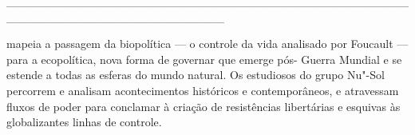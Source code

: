 \hspace*{-2cm}\_\_\_\_\_\_\_\_\_\_\_\_\_\_\_\_\_\_\_\_\_\_\_\_\_\_\_\_\_\_\_\_\_\_\_\_\_\_\_\_\_\_\_\_\_\_\_\_\_\_\_\_\_\_\_\_\_\_\_\_\_\_\_\_\_\_\_\_\_\_\_\_\_\_

\medskip

 mapeia a passagem da biopolítica — o controle da vida analisado por Foucault — para a ecopolítica, nova forma de governar que emerge pós- Guerra Mundial e se estende a todas as esferas do mundo natural. Os estudiosos do grupo Nu"-Sol percorrem e analisam acontecimentos históricos e contemporâneos, e atravessam fluxos de poder para conclamar à criação de resistências libertárias e esquivas às globalizantes linhas de controle.

\hspace{.5cm}

\hspace*{-.4cm}\begin{minipage}[c]{0.90\linewidth}
\footnotesize{
{}}
\end{minipage}

\pagebreak